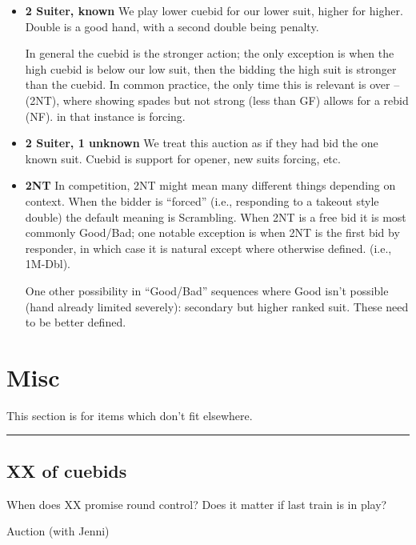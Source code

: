 \documentclass[tom-ari]{subfile}
\begin{document}
\begin{itemize}[]
\item \textbf{2 Suiter, known} We play lower cuebid for our lower suit, higher for higher. Double is a good hand, with a second double being penalty.

In general the cuebid is the stronger action; the only exception is when the high cuebid is below our low suit, then the bidding the high suit is stronger than the cuebid.  In common practice, the only time this is relevant is over --(2NT), where  showing spades but not strong (less than GF) allows for a  rebid (NF).  in that instance is forcing.	

\item \textbf{2 Suiter, 1 unknown} We treat this auction as if they had bid the one known suit. Cuebid is support for opener, new suits forcing, etc.

\item \textbf{2NT} In competition, 2NT might mean many different things depending on context. When the bidder is ``forced'' (i.e., responding to a takeout style double) the default meaning is Scrambling. When 2NT is a free bid it is most commonly Good/Bad; one notable exception is when 2NT is the first bid by responder, in which case it is natural except where otherwise defined. (i.e., 1M-Dbl).

One other possibility in ``Good/Bad'' sequences where Good isn't possible (hand already limited severely): secondary but higher ranked suit. These need to be better defined. 
\end{itemize}

\section{Misc}

This section is for items which don't fit elsewhere.

\vspace{1em}\hrule

\subsection{XX of cuebids}


When does XX promise \first round control? Does it matter if last train is in play?

Auction (with Jenni)

\end{document}
